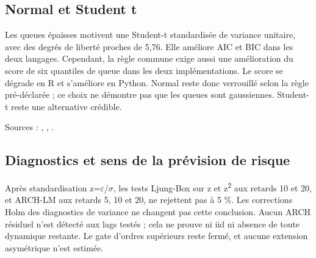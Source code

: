 \subsection{Normal et Student t}



Les queues épaisses motivent une Student-t standardisée de variance unitaire, avec des degrés de liberté proches de 5,76. Elle améliore AIC et BIC dans les deux langages. Cependant, la règle commune exige aussi une amélioration du score de six quantiles de queue dans les deux implémentations. Le score se dégrade en R et s’améliore en Python. Normal reste donc verrouillé selon la règle pré-déclarée ; ce choix ne démontre pas que les queues sont gaussiennes. Student-t reste une alternative crédible.



\begingroup\small\raggedright
Sources : , , .
\par\endgroup





\subsection{Diagnostics et sens de la prévision de risque}



Après standardisation z=\(\varepsilon\)/\(\sigma\), les tests Ljung-Box sur z et z\textsuperscript{2} aux retards 10 et 20, et ARCH-LM aux retards 5, 10 et 20, ne rejettent pas à 5 \%. Les corrections Holm des diagnostics de variance ne changent pas cette conclusion. Aucun ARCH résiduel n’est détecté aux lags testés ; cela ne prouve ni iid ni absence de toute dynamique restante. Le gate d’ordres supérieurs reste fermé, et aucune extension asymétrique n’est estimée.






